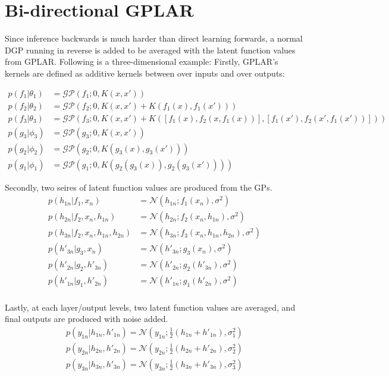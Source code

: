 \documentclass{article}
\begin{document}
\section*{Bi-directional GPLAR}
Since inference backwards is much harder than direct learning forwards, a normal DGP running in reverse is added to be averaged with the latent function values from GPLAR.  Following is a three-dimensional example: Firstly, GPLAR's kernels are defined as additive kernels between over inputs and over outputs:

\begin{align*}
    p(f_1|\theta_1) &= \mathcal{GP}(f_1; 0, K(x,x'))\\
    p(f_2|\theta_2) &= \mathcal{GP}(f_2; 0, K(x,x') + K(f_1(x), f_1(x')))\\
    p(f_3|\theta_3) &= \mathcal{GP}\left(f_3; 0, K(x,x') + K(\left[f_1(x),f_2(x, f_1(x))\right], \left[f_1(x'),f_2(x',f_1(x'))\right])\right)\\
    p(g_3|\phi_3) &= \mathcal{GP}(g_3; 0, K(x,x'))\\
    p(g_2|\phi_2) &= \mathcal{GP}(g_2; 0, K(g_3(x),g_3(x')))\\
    p(g_1|\phi_1) &= \mathcal{GP}(g_1; 0, K(g_2(g_3(x)), g_2(g_3(x'))))
\end{align*}

Secondly, two seires of latent function values are produced from the GPs.
\begin{align*}
    p(h_{1n}|f_1,x_n) &= \mathcal{N}(h_{1n}; f_1(x_n), \sigma^2)\\
    p(h_{2n}|f_2,x_n,h_{1n}) &= \mathcal{N}(h_{2n}; f_2(x_n,h_{1n}), \sigma^2)\\
    p(h_{3n}|f_2,x_n,h_{1n},h_{2n}) &= \mathcal{N}(h_{3n}; f_3(x_n,h_{1n},h_{2n}), \sigma^2)\\
    p(h'_{3n}|g_3,x_n) &= \mathcal{N}(h'_{3n};g_3(x_n),\sigma^2)\\
     p(h'_{2n}|g_2,h'_{3n}) &= \mathcal{N}(h'_{2n};g_2(h'_{3n}),\sigma^2)\\
     p(h'_{1n}|g_1,h'_{2n}) &= \mathcal{N}(h'_{1n};g_1(h'_{2n}),\sigma^2)\\
\end{align*}

Lastly, at each layer/output levels, two latent function values are averaged, and final outputs are produced with noise added.
\begin{align*}
    p(y_{1n}|h_{1n},h'_{1n}) = \mathcal{N}(y_{1n}; \frac{1}{2}(h_{1n}+h'_{1n}),\sigma_1^2)\\
    p(y_{2n}|h_{2n},h'_{2n}) = \mathcal{N}(y_{2n}; \frac{1}{2}(h_{2n}+h'_{2n}),\sigma_2^2)\\
    p(y_{3n}|h_{3n},h'_{3n}) = \mathcal{N}(y_{3n}; \frac{1}{2}(h_{3n}+h'_{3n}),\sigma_3^2)\\
\end{align*}
\end{document}
